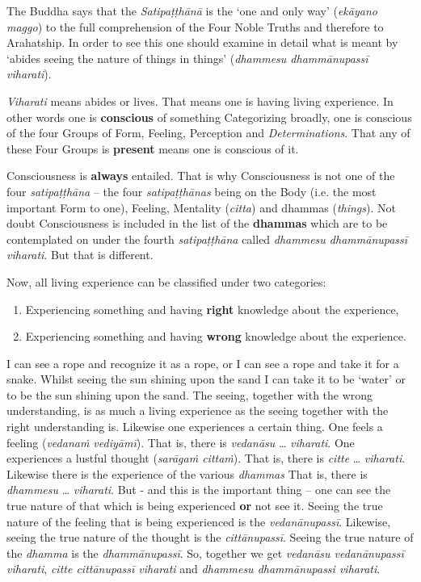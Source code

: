 The Buddha says that the \emph{Satipaṭṭhānā} is the `one and only way' (\emph{ekāyano maggo}) to the full comprehension of the Four Noble Truths and therefore to Arahatship. In order to see this one should examine in detail what is meant by `abides seeing the nature of things in things' (\emph{dhammesu dhammānupassī viharati}).

\emph{Viharati} means abides or lives. That means one is having living experience. In other words one is \textbf{conscious} of something Categorizing broadly, one is conscious of the four Groups of Form, Feeling, Perception and \emph{Determinations}. That any of these Four Groups is \textbf{present} means one is conscious of it.

Consciousness is \textbf{always} entailed. That is why Consciousness is not one of the four \emph{satipaṭṭhāna} -- the four \emph{satipaṭṭhānas} being on the Body (i.e. the most important Form to one), Feeling, Mentality (\emph{citta}) and dhammas (\emph{things}). Not doubt Consciousness is included in the list of the \textbf{dhammas} which are to be contemplated on under the fourth \emph{satipaṭṭhāna} called \emph{dhammesu dhammānupassī viharati}. But that is different.

Now, all living experience can be classified under two categories:

\begin{enumerate}
\def\labelenumi{\arabic{enumi}.}
\item
  Experiencing something and having \textbf{right} knowledge about the experience,
\item
  Experiencing something and having \textbf{wrong} knowledge about the experience.
\end{enumerate}

I can see a rope and recognize it as a rope, or I can see a rope and take it for a snake. Whilst seeing the sun shining upon the sand I can take it to be `water' or to be the sun shining upon the sand. The seeing, together with the wrong understanding, is as much a living experience as the seeing together with the right understanding is. Likewise one experiences a certain thing. One feels a feeling (\emph{vedanaṁ vediyāmī}). That is, there is \emph{vedanāsu} \ldots\hspace{0pt} \emph{viharati}. One experiences a lustful thought (\emph{sarāgaṁ cittaṁ}). That is, there is \emph{citte} \ldots\hspace{0pt} \emph{viharati}. Likewise there is the experience of the various \emph{dhammas} That is, there is \emph{dhammesu} \ldots\hspace{0pt} \emph{viharati}. But - and this is the important thing -- one can see the true nature of that which is being experienced \textbf{or} not see it. Seeing the true nature of the feeling that is being experienced is the \emph{vedanānupassī}. Likewise, seeing the true nature of the thought is the \emph{cittānupassī}. Seeing the true nature of the \emph{dhamma} is the \emph{dhammānupassī}. So, together we get \emph{vedanāsu vedanānupassī viharati}, \emph{citte cittānupassī viharati} and \emph{dhammesu dhammānupassi viharati}.

